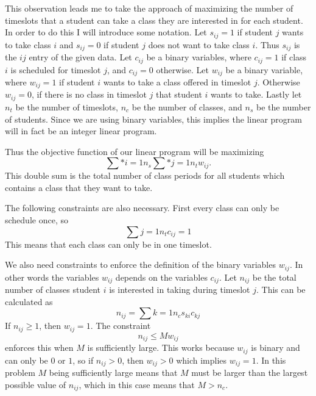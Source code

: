 \documentclass[11pt, oneside]{article}
\begin{document}
\begin{enumerate}
        This observation leads me to take the approach of maximizing the number
        of timeslots that a student can take a class they are interested in for
        each student.
        In order to do this I will introduce some notation.
        Let $s_{ij} = 1$ if student $j$ wants to take class $i$ and $s_{ij} = 0$
        if student $j$ does not want to take class $i$.
        Thus $s_{ij}$ is the $ij$ entry of the given data.
        Let $c_{ij}$ be a binary variables, where $c_{ij} = 1$ if class $i$ is
        scheduled for timeslot $j$, and $c_{ij} = 0$ otherwise.
        Let $w_{ij}$ be a binary variable, where $w_{ij} = 1$ if student $i$
        wants to take a class offered in timeslot $j$.
        Otherwise $w_{ij} = 0$, if there is no class in timeslot $j$ that
        student $i$ wants to take.
        Lastly let $n_t$ be the number of timeslots, $n_c$ be the number of
        classes, and $n_s$ be the number of students.
        Since we are using binary variables, this implies the linear program
        will in fact be an integer linear program.

        Thus the objective function of our linear program will be maximizing
        \[
            \sum*{i = 1}{n_s}{\sum*{j=1}{n_t}{w_{ij}}}.
        \]
        This double sum is the total number of class periods for all students
        which contains a class that they want to take.

        The following constraints are also necessary.
        First every class can only be schedule once, so
        \[
            \sum{j=1}{n_t}{c_{ij}} = 1
        \]
        This means that each class can only be in one timeslot.

        We also need constraints to enforce the definition of the binary
        variables $w_{ij}$.
        In other words the variables $w_{ij}$ depends on the variables
        $c_{ij}$.
        Let $n_{ij}$ be the total number of classes student $i$ is interested in
        taking during timeslot $j$.
        This can be calculated as
        \[
            n_{ij} = \sum{k = 1}{n_c}{s_{ki} c_{kj}}
        \]
        If $n_{ij} \ge 1$, then $w_{ij} = 1$.
        The constraint
        \[
            n_{ij} \le M w_{ij}
        \]
        enforces this when $M$ is sufficiently large.
        This works because $w_{ij}$ is binary and can only be $0$ or $1$, so if
        $n_{ij} > 0$, then $w_{ij} > 0$ which implies $w_{ij} = 1$.
        In this problem $M$ being sufficiently large means that $M$ must be
        larger than the largest possible value of $n_{ij}$, which in this case
        means that $M > n_c$.


\end{enumerate}
\end{document}
